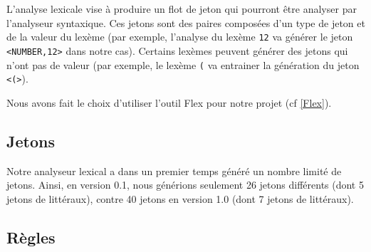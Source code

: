 L'analyse lexicale vise à produire un flot de jeton qui pourront être analyser par l'analyseur syntaxique. Ces jetons sont des paires composées d'un type de jeton et de la valeur du lexème (par exemple, l'analyse du lexème \verb|12| va générer le jeton \verb|<NUMBER,12>| dans notre cas). Certains lexèmes peuvent générer des jetons qui n'ont pas de valeur (par exemple, le lexème \verb|(| va entrainer la génération du jeton \verb|<(>|).

Nous avons fait le choix d'utiliser l'outil Flex pour notre projet (cf \ref{Flex}).

\subsection{Jetons}
Notre analyseur lexical a dans un premier temps généré un nombre limité de jetons. Ainsi, en version 0.1, nous générions seulement 26 jetons différents (dont 5 jetons de littéraux), contre 40 jetons en version 1.0 (dont 7 jetons de littéraux).

\subsubsection{}

\subsection{Règles}



